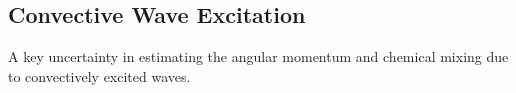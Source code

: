 {\color{purple}
\subsection{Convective Wave Excitation}
}

A key uncertainty in estimating the angular momentum and chemical mixing due to convectively excited waves.
